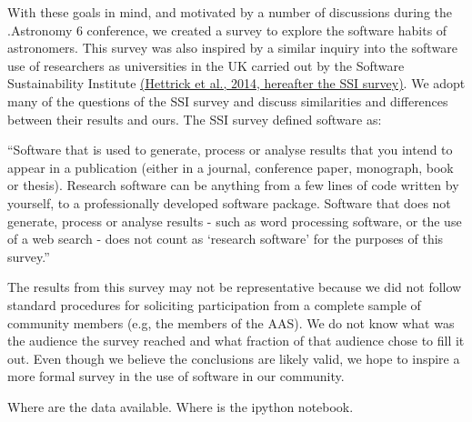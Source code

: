 With these goals in mind, and motivated by a number of discussions during the .Astronomy 6 conference, we created a survey to explore the software habits of astronomers. This survey was also inspired by a similar inquiry into the software use of researchers as universities in the UK carried out by the Software Sustainability Institute \href{(http://www.software.ac.uk/blog/2014-12-04-its-impossible-conduct-research-without-software-say-7-out-10-uk-researchers#comment-14813}{(Hettrick et al., 2014, hereafter the SSI survey)}. We adopt many of the questions of the SSI survey and discuss similarities and differences between their results and ours. The SSI survey defined software as:

“Software that is used to generate, process or analyse results that you intend to appear in a publication (either in a journal, conference paper, monograph, book or thesis). Research software can be anything from a few lines of code written by yourself, to a professionally developed software package. Software that does not generate, process or analyse results - such as word processing software, or the use of a web search - does not count as ‘research software’ for the purposes of this survey.”

The results from this survey may not be representative because we did not follow standard procedures for soliciting participation from a complete sample of community members (e.g, the members of the AAS). We do not know what was the audience the survey reached and what fraction of that audience chose to fill it out. Even though we believe the conclusions are likely valid, we hope to inspire a more formal survey in the use of software in our community.

Where are the data available. Where is the ipython notebook.